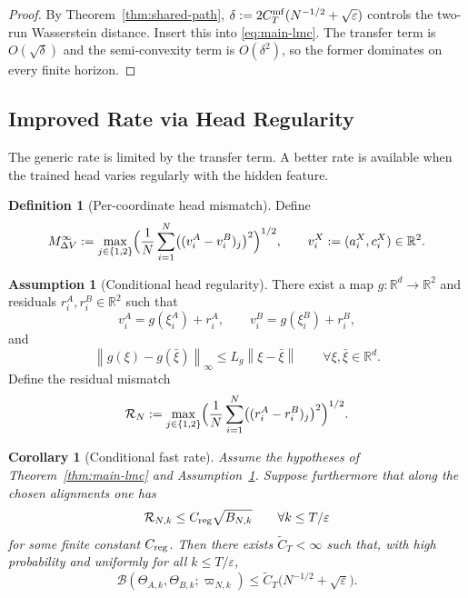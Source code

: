 \documentclass[11pt]{article}
\newtheorem{corollary}[theorem]{Corollary}
\theoremstyle{definition}
\newtheorem{definition}[theorem]{Definition}
\newtheorem{assumption}[theorem]{Assumption}
\newcommand{\R}{\mathbb{R}}
\newcommand{\norm}[1]{\left\lVert #1 \right\rVert}
\newcommand{\mc}[1]{\mathcal{#1}}
\newcommand{\cB}{\mathcal{B}}
\begin{document}
\begin{proof}
By Theorem~\ref{thm:shared-path},
$\delta:=2C_T^{\rm mf}(N^{-1/2}+\sqrt{\varepsilon})$ controls the two-run
Wasserstein distance. Insert this into \eqref{eq:main-lmc}. The transfer term
is $O(\sqrt{\delta})$ and the semi-convexity term is $O(\delta^2)$, so the
former dominates on every finite horizon.
\end{proof}

\subsection{Improved Rate via Head Regularity}

The generic rate is limited by the transfer term. A better rate is available
when the trained head varies regularly with the hidden feature.

\begin{definition}[Per-coordinate head mismatch]
\label{def:head-mismatch}
Define
\[
  M_{\Delta V}^\infty
  :=
  \max_{j\in\{1,2\}}
  \Bigl(
    \frac1N\sum_{i=1}^N \bigl((v_i^A-v_i^B)_j\bigr)^2
  \Bigr)^{1/2},
  \qquad
  v_i^X:=(a_i^X,c_i^X)\in\R^2.
\]
\end{definition}

\begin{assumption}[Conditional head regularity]
\label{ass:head-regularity}
There exist a map $g:\R^d\to\R^2$ and residuals $r_i^A,r_i^B\in\R^2$ such that
\[
  v_i^A=g(\xi_i^A)+r_i^A,
  \qquad
  v_i^B=g(\xi_i^B)+r_i^B,
\]
and
\[
  \norm{g(\xi)-g(\bar\xi)}_\infty
  \le
  L_g\norm{\xi-\bar\xi}
  \qquad
  \forall \xi,\bar\xi\in\R^d.
\]
Define the residual mismatch
\[
  \mc{R}_N
  :=
  \max_{j\in\{1,2\}}
  \Bigl(
    \frac1N\sum_{i=1}^N \bigl((r_i^A-r_i^B)_j\bigr)^2
  \Bigr)^{1/2}.
\]
\end{assumption}

\begin{corollary}[Conditional fast rate]
\label{cor:fast-rate}
Assume the hypotheses of Theorem~\ref{thm:main-lmc} and
Assumption~\ref{ass:head-regularity}. Suppose furthermore that along the chosen
alignments one has
\[
  \mc{R}_{N,k}
  \le
  C_{\rm reg}\sqrt{B_{N,k}}
  \qquad
  \forall k\le T/\varepsilon
\]
for some finite constant $C_{\rm reg}$. Then there exists
$\widetilde C_T<\infty$ such that, with high probability and uniformly for all
$k\le T/\varepsilon$,
\[
  \cB(\Theta_{A,k},\Theta_{B,k};\varpi_{N,k})
  \le
  \widetilde C_T\bigl(N^{-1/2}+\sqrt{\varepsilon}\bigr).
\]
\end{corollary}
\end{document}
